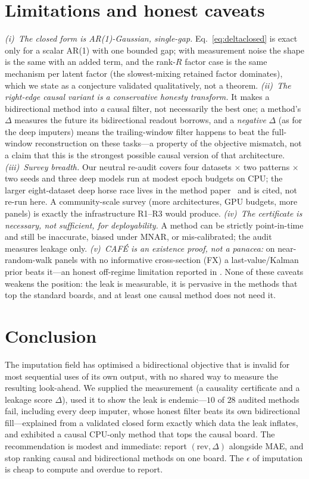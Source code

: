 \documentclass[10pt,twocolumn]{article}
\newcommand{\cafe}{CAF\'E}
\begin{document}
\section{Limitations and honest caveats}\label{sec:limits}
\emph{(i)~The closed form is AR(1)-Gaussian, single-gap.} Eq.~\eqref{eq:deltaclosed}
is exact only for a scalar AR(1) with one bounded gap; with measurement noise the
shape is the same with an added term, and the rank-$R$ factor case is the same
mechanism per latent factor (the slowest-mixing retained factor dominates), which
we state as a conjecture validated qualitatively, not a theorem. \emph{(ii)~The
right-edge causal variant is a \emph{conservative} honesty transform.} It makes a
bidirectional method into \emph{a} causal filter, not necessarily the best one;
a method's $\Delta$ measures the future its bidirectional readout borrows, and a
\emph{negative} $\Delta$ (as for the deep imputers) means the trailing-window
filter happens to beat the full-window reconstruction on these tasks---a property
of the objective mismatch, not a claim that this is the strongest possible causal
version of that architecture. \emph{(iii)~Survey breadth.} Our neutral re-audit
covers four datasets $\times$ two patterns $\times$ two seeds and three deep
models run at modest epoch budgets on CPU; the larger eight-dataset deep horse
race lives in the method paper~\cite{snow2025cafe} and is cited, not re-run here.
A community-scale survey (more architectures, GPU budgets, more panels) is exactly
the infrastructure R1--R3 would produce. \emph{(iv)~The certificate is
necessary, not sufficient, for deployability.} A method can be strictly
point-in-time and still be inaccurate, biased under MNAR, or mis-calibrated; the
audit measures leakage only. \emph{(v)~\cafe{} is an existence proof, not a
panacea:} on near-random-walk panels with no informative cross-section (FX) a
last-value/Kalman prior beats it---an honest off-regime limitation reported in
\cite{snow2025cafe}. None of these caveats weakens the position: the leak is
measurable, it is pervasive in the methods that top the standard boards, and at
least one causal method does not need it.

\section{Conclusion}
The imputation field has optimised a bidirectional objective that is invalid for
most sequential uses of its own output, with no shared way to measure the
resulting look-ahead. We supplied the measurement (a causality certificate and a
leakage score $\Delta$), used it to show the leak is endemic---$10$ of $28$
audited methods fail, including every deep imputer, whose honest filter beats its
own bidirectional fill---explained from a validated closed form exactly which
data the leak inflates, and exhibited a causal CPU-only method that tops the
causal board. The recommendation is modest and immediate: report
$(\mathrm{rev},\Delta)$ alongside MAE, and stop ranking causal and bidirectional
methods on one board. The $\epsilon$ of imputation is cheap to compute and
overdue to report.
\end{document}
